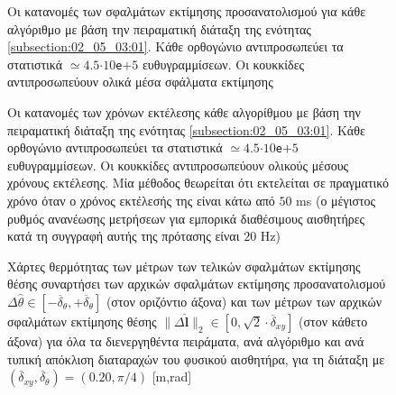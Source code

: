\begin{figure}\vspace{1cm}\hspace{0.5cm}
  
  \vspace{-4cm}
  \caption{\small Οι κατανομές των σφαλμάτων εκτίμησης προσανατολισμού για κάθε
           αλγόριθμο με βάση την πειραματική διάταξη της ενότητας
           \ref{subsection:02_05_03:01}. Κάθε ορθογώνιο αντιπροσωπεύει τα
           στατιστικά $\simeq 4.5$$\cdot$$10$\texttt{e}$+$$5$ ευθυγραμμίσεων.
           Οι κουκκίδες αντιπροσωπεύουν ολικά μέσα σφάλματα εκτίμησης}
  \label{fig:02_05_03:02:02}
\end{figure}

\begin{figure}\vspace{1cm}\hspace{0.5cm}
  
  \vspace{-4cm}
  \caption{\small Οι κατανομές των χρόνων εκτέλεσης κάθε
           αλγορίθμου με βάση την πειραματική διάταξη της ενότητας
           \ref{subsection:02_05_03:01}. Κάθε ορθογώνιο αντιπροσωπεύει τα
           στατιστικά $\simeq 4.5$$\cdot$$10$\texttt{e}$+$$5$ ευθυγραμμίσεων.
           Οι κουκκίδες αντιπροσωπεύουν ολικούς μέσους χρόνους εκτέλεσης.
           Μία μέθοδος θεωρείται ότι εκτελείται σε πραγματικό χρόνο όταν ο
           χρόνος εκτέλεσής της είναι κάτω από $50$ ms (ο μέγιστος ρυθμός
           ανανέωσης μετρήσεων για εμπορικά διαθέσιμους αισθητήρες κατά τη
           συγγραφή αυτής της πρότασης είναι $20$ Hz)}
  \label{fig:02_05_03:02:03}
\end{figure}

\begin{figure}\vspace{1cm}\hspace{0.5cm}
  
  \vspace{1cm}
  \caption{\small Χάρτες θερμότητας των μέτρων των τελικών σφαλμάτων εκτίμησης
           θέσης συναρτήσει των αρχικών σφαλμάτων εκτίμησης προσανατολισμού
           $\Delta\hat{\theta} \in
           [-\overline{\delta}_{\theta},+\overline{\delta}_{\theta}]$ (στον
           οριζόντιο άξονα) και των μέτρων των αρχικών σφαλμάτων εκτίμησης
           θέσης $\|\Delta \hat{\bm{l}}\|_2 \in [0, \sqrt{2}\cdot
           \overline{\delta}_{xy}]$ (στον κάθετο άξονα) για όλα τα
           διενεργηθέντα πειράματα, ανά αλγόριθμο και ανά τυπική απόκλιση
           διαταραχών του φυσικού αισθητήρα, για τη διάταξη με
           $(\overline{\delta}_{xy}, \overline{\delta}_{\theta}) = (0.20,
           \pi/4)$ [m,rad]}
  \label{fig:02_05_03:02:04}
\end{figure}



